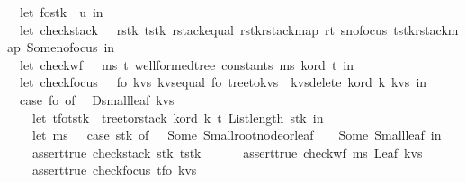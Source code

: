\begin{isabellebody}
\ \ let\ {\isacharparenleft}fo{\isacharcomma}stk{\isacharparenright}\ {\isacharequal}\ u\ in\isanewline
\ \ let\ check{\isacharunderscore}stack\ {\isacharequal}\ {\isacharpercent}\ rstk\ tstk{\isachardot}\ {\isacharparenleft}rstack{\isacharunderscore}equal\ {\isacharparenleft}rstk{\isacharbar}{\isachargreater}rstack{\isacharunderscore}map\ {\isacharparenleft}r{}t\ s{\isacharparenright}{\isacharbar}{\isachargreater}no{\isacharunderscore}focus{\isacharparenright}\ {\isacharparenleft}tstk{\isacharbar}{\isachargreater}rstack{\isacharunderscore}map\ Some{\isacharbar}{\isachargreater}no{\isacharunderscore}focus{\isacharparenright}{\isacharparenright}\ in\isanewline
\ \ let\ check{\isacharunderscore}wf\ {\isacharequal}\ {\isacharpercent}\ ms\ t{\isachardot}\ {\isacharparenleft}wellformed{\isacharunderscore}tree\ constants\ ms\ k{\isacharunderscore}ord\ t{\isacharparenright}\ in\isanewline
\ \ let\ check{\isacharunderscore}focus\ {\isacharequal}\ {\isacharpercent}\ fo\ kvs{\isachardot}\ kvs{\isacharunderscore}equal\ {\isacharparenleft}fo{\isacharbar}{\isachargreater}\ tree{\isacharunderscore}to{\isacharunderscore}kvs\ {\isacharbar}{\isachargreater}\ kvs{\isacharunderscore}delete\ k{\isacharunderscore}ord\ k{\isacharparenright}\ kvs\ in\isanewline
\ \ case\ fo\ of\isanewline
\ \ D{\isacharunderscore}small{\isacharunderscore}leaf\ kvs\ {\isasymRightarrow}\ {\isacharparenleft}\isanewline
\ \ \ \ let\ {\isacharparenleft}t{\isacharunderscore}fo{\isacharcomma}t{\isacharunderscore}stk{\isacharparenright}\ {\isacharequal}\ tree{\isacharunderscore}to{\isacharunderscore}rstack\ k{\isacharunderscore}ord\ k\ t{}\ {\isacharparenleft}List{\isachardot}length\ stk{\isacharparenright}\ in\isanewline
\ \ \ \ let\ ms\ \ {\isacharequal}\ {\isacharparenleft}case\ stk\ of\ {\isacharbrackleft}{\isacharbrackright}\ {\isasymRightarrow}\ Some\ Small{\isacharunderscore}root{\isacharunderscore}node{\isacharunderscore}or{\isacharunderscore}leaf\ {\isacharbar}\ {\isacharunderscore}\ {\isasymRightarrow}\ Some\ Small{\isacharunderscore}leaf{\isacharparenright}\ in\isanewline
\ \ \ \ assert{\isacharunderscore}true\ {\isacharparenleft}check{\isacharunderscore}stack\ stk\ t{\isacharunderscore}stk{\isacharparenright}\ {\isacharampersand}\ \isanewline
\ \ \ \ assert{\isacharunderscore}true\ {\isacharparenleft}check{\isacharunderscore}wf\ ms\ {\isacharparenleft}Leaf\ kvs{\isacharparenright}{\isacharparenright}\ {\isacharampersand}\isanewline
\ \ \ \ assert{\isacharunderscore}true\ {\isacharparenleft}check{\isacharunderscore}focus\ t{\isacharunderscore}fo\ kvs{\isacharparenright}\isanewline

\end{isabellebody}
